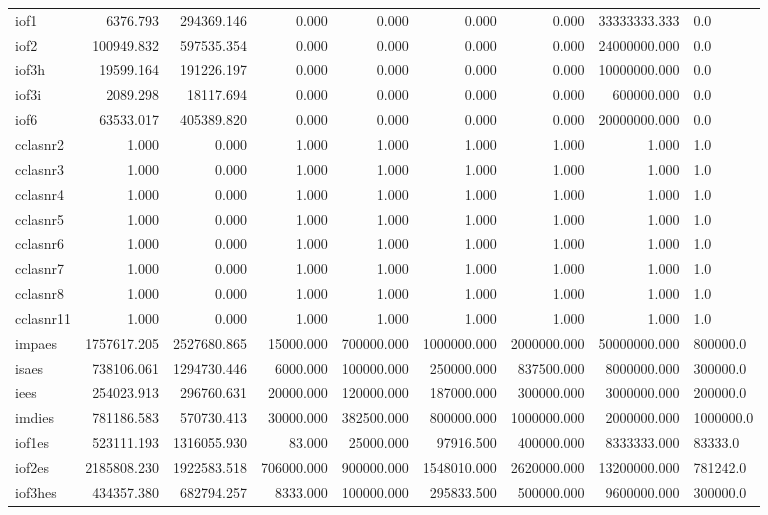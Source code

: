 \begin{longtable}{lrrrrrrrl}
iof1 & 6376.793 & 294369.146 & 0.000 & 0.000 & 0.000 & 0.000 & 33333333.333 & 0.0 \\
iof2 & 100949.832 & 597535.354 & 0.000 & 0.000 & 0.000 & 0.000 & 24000000.000 & 0.0 \\
iof3h & 19599.164 & 191226.197 & 0.000 & 0.000 & 0.000 & 0.000 & 10000000.000 & 0.0 \\
iof3i & 2089.298 & 18117.694 & 0.000 & 0.000 & 0.000 & 0.000 & 600000.000 & 0.0 \\
iof6 & 63533.017 & 405389.820 & 0.000 & 0.000 & 0.000 & 0.000 & 20000000.000 & 0.0 \\
cclasnr2 & 1.000 & 0.000 & 1.000 & 1.000 & 1.000 & 1.000 & 1.000 & 1.0 \\
cclasnr3 & 1.000 & 0.000 & 1.000 & 1.000 & 1.000 & 1.000 & 1.000 & 1.0 \\
cclasnr4 & 1.000 & 0.000 & 1.000 & 1.000 & 1.000 & 1.000 & 1.000 & 1.0 \\
cclasnr5 & 1.000 & 0.000 & 1.000 & 1.000 & 1.000 & 1.000 & 1.000 & 1.0 \\
cclasnr6 & 1.000 & 0.000 & 1.000 & 1.000 & 1.000 & 1.000 & 1.000 & 1.0 \\
cclasnr7 & 1.000 & 0.000 & 1.000 & 1.000 & 1.000 & 1.000 & 1.000 & 1.0 \\
cclasnr8 & 1.000 & 0.000 & 1.000 & 1.000 & 1.000 & 1.000 & 1.000 & 1.0 \\
cclasnr11 & 1.000 & 0.000 & 1.000 & 1.000 & 1.000 & 1.000 & 1.000 & 1.0 \\
impaes & 1757617.205 & 2527680.865 & 15000.000 & 700000.000 & 1000000.000 & 2000000.000 & 50000000.000 & 800000.0 \\
isaes & 738106.061 & 1294730.446 & 6000.000 & 100000.000 & 250000.000 & 837500.000 & 8000000.000 & 300000.0 \\
iees & 254023.913 & 296760.631 & 20000.000 & 120000.000 & 187000.000 & 300000.000 & 3000000.000 & 200000.0 \\
imdies & 781186.583 & 570730.413 & 30000.000 & 382500.000 & 800000.000 & 1000000.000 & 2000000.000 & 1000000.0 \\
iof1es & 523111.193 & 1316055.930 & 83.000 & 25000.000 & 97916.500 & 400000.000 & 8333333.000 & 83333.0 \\
iof2es & 2185808.230 & 1922583.518 & 706000.000 & 900000.000 & 1548010.000 & 2620000.000 & 13200000.000 & 781242.0 \\
iof3hes & 434357.380 & 682794.257 & 8333.000 & 100000.000 & 295833.500 & 500000.000 & 9600000.000 & 300000.0 \\

\end{longtable}
